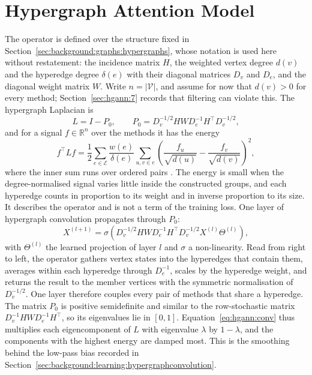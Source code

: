 \section{Hypergraph Attention Model}
\label{sec:hgann:8}

The operator is defined over the structure fixed in
Section~\ref{sec:background:graphs:hypergraphs}, whose notation is used here without restatement:
the incidence matrix $H$, the weighted vertex degree $d(v)$ and the hyperedge degree $\delta(e)$
with their diagonal matrices $D_v$ and $D_e$, and the diagonal weight matrix $W$. Write
$n = \lvert \mathcal{V} \rvert$, and assume for now that $d(v) > 0$ for every method;
Section~\ref{sec:hgann:7} records that filtering can violate this. The hypergraph Laplacian is
\begin{equation}
  L = I - P_0 , \qquad P_0 = D_v^{-1/2} H W D_e^{-1} H^{\top} D_v^{-1/2} ,
  \label{eq:hgann:laplacian}
\end{equation}
and for a signal $f \in \mathbb{R}^{n}$ over the methods it has the energy
\begin{equation}
  f^{\top} L f = \frac{1}{2} \sum_{e \in \mathcal{E}} \frac{w(e)}{\delta(e)}
  \sum_{u, v \in e} \left( \frac{f_u}{\sqrt{d(u)}} - \frac{f_v}{\sqrt{d(v)}} \right)^{2} ,
  \label{eq:hgann:energy}
\end{equation}
where the inner sum runs over ordered pairs \cite{zhou2006learning}. The energy is small when the
degree-normalised signal varies little inside the constructed groups, and each hyperedge counts in
proportion to its weight and in inverse proportion to its size. It describes the operator and is
not a term of the training loss. One layer of hypergraph convolution propagates through $P_0$:
\begin{equation}
  X^{(l+1)} = \sigma\!\left( D_v^{-1/2} H W D_e^{-1} H^{\top} D_v^{-1/2} X^{(l)} \Theta^{(l)} \right) ,
  \label{eq:hgann:conv}
\end{equation}
with $\Theta^{(l)}$ the learned projection of layer $l$ and $\sigma$ a non-linearity. Read from
right to left, the operator gathers vertex states into the hyperedges that contain them, averages
within each hyperedge through $D_e^{-1}$, scales by the hyperedge weight, and returns the result to
the member vertices with the symmetric normalisation of $D_v^{-1/2}$. One layer therefore couples
every pair of methods that share a hyperedge. The matrix $P_0$ is positive semidefinite and similar
to the row-stochastic matrix $D_v^{-1} H W D_e^{-1} H^{\top}$, so its eigenvalues lie in $[0,1]$.
Equation~\ref{eq:hgann:conv} thus multiplies each eigencomponent of $L$ with eigenvalue $\lambda$ by
$1 - \lambda$, and the components with the highest energy are damped most. This is the smoothing
behind the low-pass bias recorded in Section~\ref{sec:background:learning:hypergraphconvolution}.

